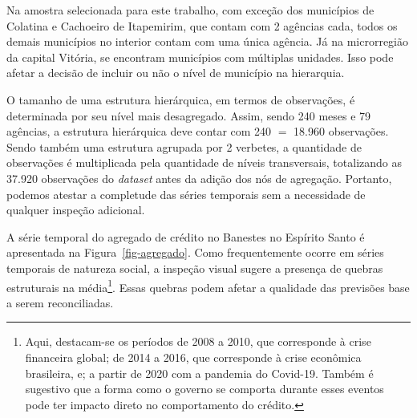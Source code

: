\documentclass[
  12pt,
  twoside,
  openright,
  a4paper,
  chapter=TITLE,
  section=TITLE,
  brazil]{abntex2}
\begin{document}
Na amostra selecionada para este trabalho, com exceção dos municípios de
Colatina e Cachoeiro de Itapemirim, que contam com 2 agências cada,
todos os demais municípios no interior contam com uma única agência. Já
na microrregião da capital Vitória, se encontram municípios com
múltiplas unidades. Isso pode afetar a decisão de incluir ou não o nível
de município na hierarquia.

O tamanho de uma estrutura hierárquica, em termos de observações, é
determinada por seu nível mais desagregado. Assim, sendo 240 meses e 79
agências, a estrutura hierárquica deve contar com 240 \(=\)
18.960 observações. Sendo também uma estrutura agrupada por 2 verbetes,
a quantidade de observações é multiplicada pela quantidade de níveis
transversais, totalizando as 37.920 observações do \emph{dataset} antes
da adição dos nós de agregação. Portanto, podemos atestar a completude
das séries temporais sem a necessidade de qualquer inspeção adicional.

\begin{table}

\caption{\label{tbl-estban}Contagem de únicos no dataset ESTBAN}


\end{table}%

A série temporal do agregado de crédito no Banestes no Espírito Santo é
apresentada na Figura~\ref{fig-agregado}. Como frequentemente ocorre em
séries temporais de natureza social, a inspeção visual sugere a presença
de quebras estruturais na média\footnote{Aqui, destacam-se os períodos
  de 2008 a 2010, que corresponde à crise financeira global; de 2014 a
  2016, que corresponde à crise econômica brasileira, e; a partir de
  2020 com a pandemia do Covid-19. Também é sugestivo que a forma como o
  governo se comporta durante esses eventos pode ter impacto direto no
  comportamento do crédito.}. Essas quebras podem afetar a qualidade das
previsões base a serem reconciliadas.
\end{document}
